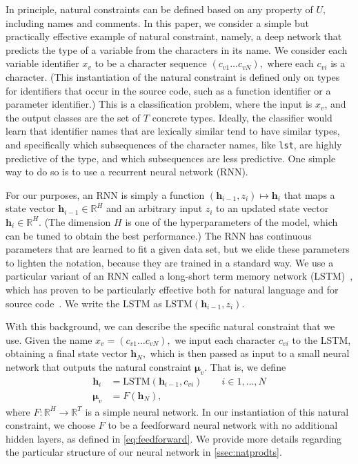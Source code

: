 \documentclass[sigplan,10pt,review,anonymous]{acmart} %
\theoremstyle{plain}
\theoremstyle{remark}
\theoremstyle{definition}
\begin{document}
In principle, natural constraints can be defined based on any property of $U,$
including names and comments.
In this paper, we consider a simple but practically effective example of
natural constraint, namely, a deep network that predicts the type
of a variable from the characters in its name.
We consider each variable identifier $x_v$ to be a character sequence $(c_{v1} \ldots c_{vN}),$
where each $c_{vi}$ is a character.
(This instantiation of the natural constraint is defined
only on types for identifiers that occur in the source code,
such as a function identifier or a parameter identifier.)
This is a classification problem, where the input is $x_v$,
and the output classes are the set of $T$ concrete types.
Ideally, the classifier would learn that identifier names that are lexically similar
tend to have similar types, and specifically which subsequences of the character names,
like \texttt{lst}, are highly predictive of the type, and which subsequences are less predictive.
One simple way to do so is to use a recurrent neural network (RNN).

For our purposes, an RNN is simply a function $(\bm{h}_{i-1}, z_i) \mapsto \bm{h}_{i}$
that maps a state vector $\bm{h}_{i-1} \in \mathbb{R}^H$
and an arbitrary input $z_i$ to an updated state vector $\bm{h}_{i}  \in \mathbb{R}^H$.
(The dimension $H$ is one of the hyperparameters of the model, which can be tuned
to obtain the best performance.)
The RNN has continuous parameters that are learned to fit a given data set,
but we elide these parameters to lighten the notation, because they are trained in a standard way.
We use a particular variant of an RNN called a
long-short term memory network (LSTM)~\cite{hochreiter97},
which has proven to be particularly effective both for natural language
and for source code~\cite{sundermeyer2012,melis17,white2015,dam16}.
We write the LSTM as $\text{LSTM}(\bm{h}_{i-1}, z_i)$.

With this background, we can describe the specific natural constraint that we use.
Given the name $x_v = (c_{v1} \ldots c_{vN}),$ we input each character $c_{vi}$ to the LSTM,
obtaining a final state vector $\bm{h}_N,$ which is then passed as input to a small
neural network that outputs the natural constraint $\bm{\mu}_v$.
That is, we define
\begin{subequations}\label{eq:lstm}
	\begin{align}
		\bm{h}_i   & = \text{LSTM}(\bm{h}_{i-1}, c_{vi}) \qquad i \in 1, \ldots, N \\
		\bm{\mu}_v & = F(\bm{h}_N), \label{eq:lstmb}
	\end{align}
\end{subequations}
where $F: \mathbb{R}^H \rightarrow \mathbb{R}^T$ is a simple neural network.
In our instantiation of this natural constraint, we choose $F$ to be a feedforward neural network with
no additional hidden layers, as defined in \eqref{eq:feedforward}.
We provide more details regarding the particular structure of our neural network in \cref{ssec:natprodts}.
\end{document}
